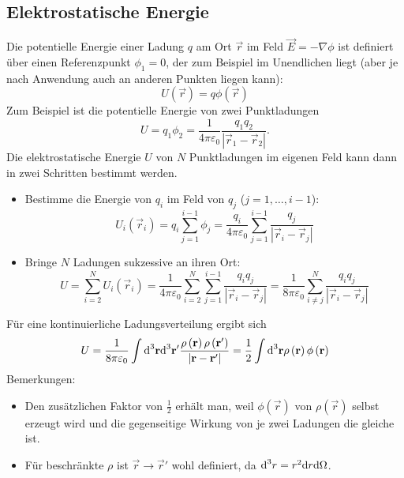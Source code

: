 \subsection{Elektrostatische Energie}

Die potentielle Energie einer Ladung $q$ am Ort $\vec {r}$ im Feld $\vec {E}=-\nabla \phi $ ist definiert über einen Referenzpunkt $\phi _{1}=0$, der zum Beispiel im Unendlichen liegt (aber je nach Anwendung auch an anderen Punkten liegen kann):
\begin{equation}
	\label{3.11}
	U\left(\vec {r}\right)=q\phi \left(\vec {r}\right)
\end{equation}
Zum Beispiel ist die potentielle Energie von zwei Punktladungen
\begin{equation*}
	U=q_{1}\phi _{2}=\frac{1}{4\pi \varepsilon _{0}}\frac{q_{1}q_{2}}{\left| \vec {r}_{1}-\vec {r}_{2}\right| }.
\end{equation*}
Die elektrostatische Energie $U$ von $N$ Punktladungen im eigenen Feld kann dann in zwei Schritten bestimmt werden.
\begin{itemize}
	\item Bestimme die Energie von $q_{i}$ im Feld von $q_{j}$ ($j=1,\ldots ,i-1$):
	      \begin{equation*}
		      U_{i}\left(\vec {r}_{i}\right)=q_{i}\sum _{j=1}^{i-1}\phi _{j}=\frac{q_{i}}{4\pi \varepsilon _{0}}\sum _{j=1}^{i-1}\frac{q_{j}}{\left| \vec {r}_{i}-\vec {r}_{j}\right| }
	      \end{equation*}
	\item Bringe $N$ Ladungen sukzessive an ihren Ort:
	      \begin{equation*}
		      U=\sum _{i=2}^{N}U_{i}\left(\vec {r}_{i}\right)=\frac{1}{4\pi \varepsilon _{0}}\sum _{i=2}^{N}\sum _{j=1}^{i-1}\frac{q_{i}q_{j}}{\left| \vec {r}_{i}-\vec {r}_{j}\right| }=\frac{1}{8\pi \varepsilon _{0}}\sum _{i\neq j}^{N}\frac{q_{i}q_{j}}{\left| \vec {r}_{i}-\vec {r}_{j}\right| }
	      \end{equation*}

\end{itemize}
Für eine kontinuierliche Ladungsverteilung ergibt sich
\begin{equation*}
	U=\frac{1}{8\pi \varepsilon _{0}}\int \text{d} ^{3}\mathbf{r}\text{d} ^{3}\mathbf{r}'\frac{\rho \left(\mathbf{r}\right)\rho \left(\mathbf{r}'\right)}{\left| \mathbf{r}-\mathbf{r}'\right| }=\frac{1}{2}\int \text{d} ^{3}\mathbf{r}\rho \left(\mathbf{r}\right)\phi \left(\mathbf{r}\right)
\end{equation*}
Bemerkungen:
\begin{itemize}
	\item Den zusätzlichen Faktor von $\frac{1}{2}$ erhält man, weil $\phi \left(\vec {r}\right)$ von $\rho \left(\vec {r}\right)$ selbst erzeugt wird und die gegenseitige Wirkung von je zwei Ladungen die gleiche ist.

	\item Für beschränkte $\rho $ ist $\vec {r}\rightarrow \vec {r}'$ wohl definiert, da $\text{d} ^{3}r=r^{2}\text{d} r\text{d} \Omega  $.


\end{itemize}
